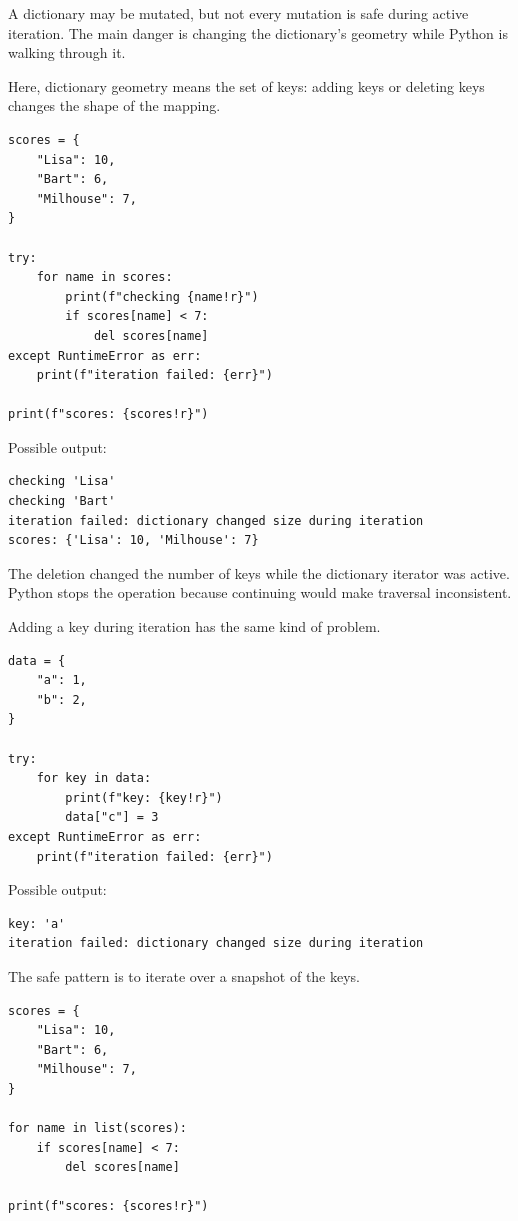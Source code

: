 A dictionary may be mutated, but not every mutation is safe during active iteration. The main danger is changing the dictionary's geometry while Python is walking through it.

Here, dictionary geometry means the set of keys: adding keys or deleting keys changes the shape of the mapping.

\begin{verbatim}
scores = {
    "Lisa": 10,
    "Bart": 6,
    "Milhouse": 7,
}

try:
    for name in scores:
        print(f"checking {name!r}")
        if scores[name] < 7:
            del scores[name]
except RuntimeError as err:
    print(f"iteration failed: {err}")

print(f"scores: {scores!r}")
\end{verbatim}

Possible output:

\begin{verbatim}
checking 'Lisa'
checking 'Bart'
iteration failed: dictionary changed size during iteration
scores: {'Lisa': 10, 'Milhouse': 7}
\end{verbatim}

The deletion changed the number of keys while the dictionary iterator was active. Python stops the operation because continuing would make traversal inconsistent.

Adding a key during iteration has the same kind of problem.

\begin{verbatim}
data = {
    "a": 1,
    "b": 2,
}

try:
    for key in data:
        print(f"key: {key!r}")
        data["c"] = 3
except RuntimeError as err:
    print(f"iteration failed: {err}")
\end{verbatim}

Possible output:

\begin{verbatim}
key: 'a'
iteration failed: dictionary changed size during iteration
\end{verbatim}

The safe pattern is to iterate over a snapshot of the keys.

\begin{verbatim}
scores = {
    "Lisa": 10,
    "Bart": 6,
    "Milhouse": 7,
}

for name in list(scores):
    if scores[name] < 7:
        del scores[name]

print(f"scores: {scores!r}")
\end{verbatim}

